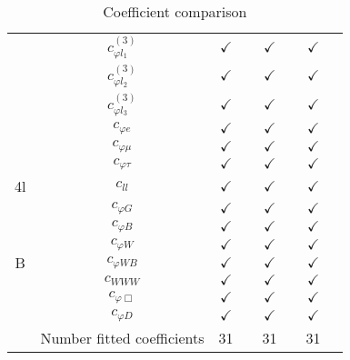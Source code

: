 \documentclass{article}
\begin{document}
\begin{table}[H]
\begin{tabular}{|c|c|c|c|c|c|c|c|}
 & $c_{\varphi l_1}^{(3)}$ & $\checkmark$ &  & $\checkmark$ &  & $\checkmark$ & \\ \cline{2-8}
 & $c_{\varphi l_2}^{(3)}$ & $\checkmark$ &  & $\checkmark$ &  & $\checkmark$ & \\ \cline{2-8}
 & $c_{\varphi l_3}^{(3)}$ & $\checkmark$ &  & $\checkmark$ &  & $\checkmark$ & \\ \cline{2-8}
 & $c_{\varphi e}$ & $\checkmark$ &  & $\checkmark$ &  & $\checkmark$ & \\ \cline{2-8}
 & $c_{\varphi \mu}$ & $\checkmark$ &  & $\checkmark$ &  & $\checkmark$ & \\ \cline{2-8}
 & $c_{\varphi \tau}$ & $\checkmark$ &  & $\checkmark$ &  & $\checkmark$ & 
\\ \hline
\multirow{1}{*}{4l}
 & $c_{ll}$ & $\checkmark$ &  & $\checkmark$ &  & $\checkmark$ & 
\\ \hline
\multirow{7}{*}{B}
 & $c_{\varphi G}$ & $\checkmark$ &  & $\checkmark$ &  & $\checkmark$ & \\ \cline{2-8}
 & $c_{\varphi B}$ & $\checkmark$ &  & $\checkmark$ &  & $\checkmark$ & \\ \cline{2-8}
 & $c_{\varphi W}$ & $\checkmark$ &  & $\checkmark$ &  & $\checkmark$ & \\ \cline{2-8}
 & $c_{\varphi WB}$ & $\checkmark$ &  & $\checkmark$ &  & $\checkmark$ & \\ \cline{2-8}
 & $c_{WWW}$ & $\checkmark$ &  & $\checkmark$ &  & $\checkmark$ & \\ \cline{2-8}
 & $c_{\varphi \Box}$ & $\checkmark$ &  & $\checkmark$ &  & $\checkmark$ & \\ \cline{2-8}
 & $c_{\varphi D}$ & $\checkmark$ &  & $\checkmark$ &  & $\checkmark$ & 
\\ \hline
\hline & Number fitted coefficients & 31 &  & 31 &  & 31 &  \\ \hline
\end{tabular}
\caption{Coefficient comparison}
\end{table}
\end{document}

